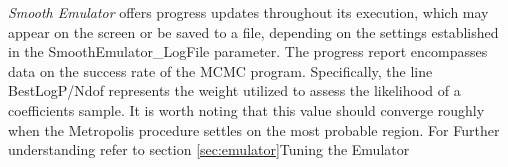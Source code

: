 \documentclass[UserManual.tex]{subfiles}
\begin{document}
{\it Smooth Emulator} offers progress updates throughout its execution, which may appear on the screen or be saved to a file, depending on the settings established in the SmoothEmulator\_LogFile parameter. The progress report encompasses data on the success rate of the MCMC program. Specifically, the line BestLogP/Ndof represents the weight utilized to assess the likelihood of a coefficients sample. It is worth noting that this value should converge roughly when the Metropolis procedure settles on the most probable region. For Further understanding refer to section \ref{sec:emulator}{Tuning the Emulator}
\end{document}
